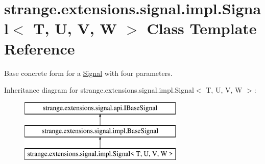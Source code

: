 \hypertarget{classstrange_1_1extensions_1_1signal_1_1impl_1_1_signal_3_01_t_00_01_u_00_01_v_00_01_w_01_4}{\section{strange.\-extensions.\-signal.\-impl.\-Signal$<$ T, U, V, W $>$ Class Template Reference}
\label{classstrange_1_1extensions_1_1signal_1_1impl_1_1_signal_3_01_t_00_01_u_00_01_v_00_01_w_01_4}
}


Base concrete form for a \hyperlink{classstrange_1_1extensions_1_1signal_1_1impl_1_1_signal}{Signal} with four parameters.  


Inheritance diagram for strange.\-extensions.\-signal.\-impl.\-Signal$<$ T, U, V, W $>$\-:\begin{figure}[H]
\begin{center}
\leavevmode
\includegraphics[height=3.000000cm]{classstrange_1_1extensions_1_1signal_1_1impl_1_1_signal_3_01_t_00_01_u_00_01_v_00_01_w_01_4}
\end{center}
\end{figure}
